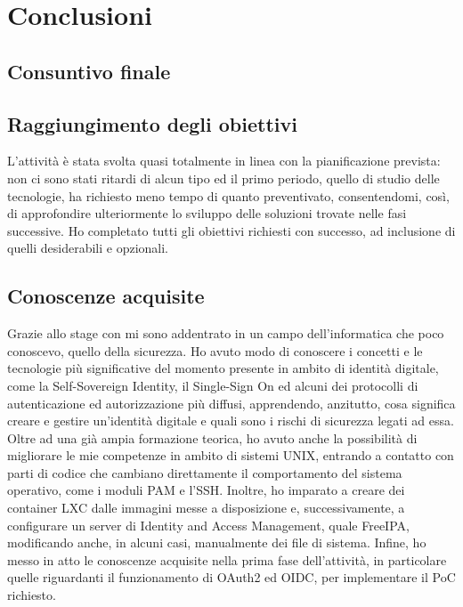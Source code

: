 
\chapter{Conclusioni}
\label{cap:conclusioni}

\section{Consuntivo finale}

\section{Raggiungimento degli obiettivi}

L'attività è stata svolta quasi totalmente in linea con la pianificazione prevista: non ci sono stati ritardi di alcun tipo ed il primo periodo, quello di studio delle tecnologie, ha richiesto meno tempo di quanto preventivato, consentendomi, così, di approfondire ulteriormente lo sviluppo delle soluzioni trovate nelle fasi successive.
Ho completato tutti gli obiettivi richiesti con successo, ad inclusione di quelli desiderabili e opzionali.

\section{Conoscenze acquisite}

Grazie allo stage con \myAzienda mi sono addentrato in un campo dell'informatica che poco conoscevo, quello della sicurezza. Ho avuto modo di conoscere i concetti e le tecnologie più significative del momento presente in ambito di identità digitale, come la Self-Sovereign Identity, il Single-Sign On ed alcuni dei protocolli di autenticazione ed autorizzazione più diffusi, apprendendo, anzitutto, cosa significa creare e gestire un'identità digitale e quali sono i rischi di sicurezza legati ad essa. Oltre ad una già ampia formazione teorica, ho avuto anche la possibilità di migliorare le mie competenze in ambito di sistemi UNIX, entrando a contatto con parti di codice che cambiano direttamente il comportamento del sistema operativo, come i moduli PAM e l'SSH. Inoltre, ho imparato a creare dei container LXC dalle immagini messe a disposizione e, successivamente, a configurare un server di Identity and Access Management, quale FreeIPA, modificando anche, in alcuni casi, manualmente dei file di sistema.
Infine, ho messo in atto le conoscenze acquisite nella prima fase dell'attività, in particolare quelle riguardanti il funzionamento di OAuth2 ed OIDC, per implementare il PoC richiesto. 

